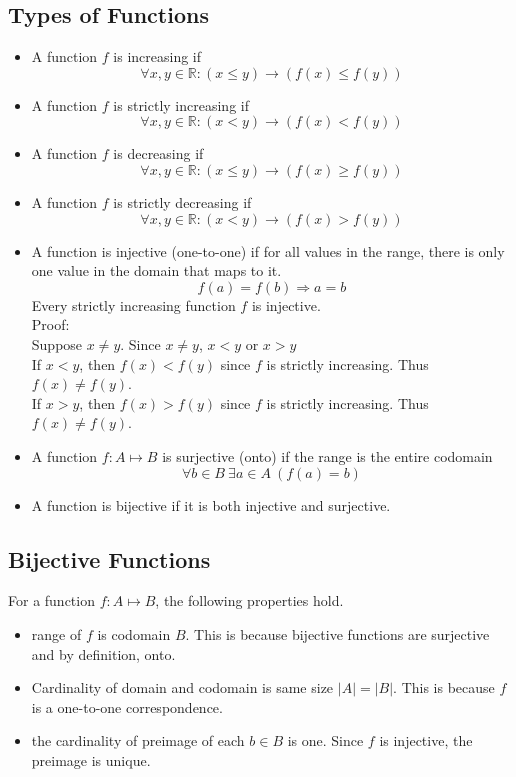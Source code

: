 \documentclass{article}
\theoremstyle{mytheoremstyle}
\theoremstyle{mytheoremstyle}
\theoremstyle{myproblemstyle}
\begin{document}
    \subsection*{Types of Functions}
    \begin{itemize}
        \item A function $f$ is increasing if
            \[
                \forall x,y\in\mathbb{R}: (x\le y) \rightarrow (f(x)\le f(y))
            \]
        \item A function $f$ is strictly increasing if
            \[
                \forall x,y\in\mathbb{R}: (x<y) \rightarrow (f(x)<f(y))
            \]
        \item A function $f$ is decreasing if
            \[
                \forall x,y\in\mathbb{R}: (x\le y) \rightarrow (f(x)\ge f(y))
            \]
        \item A function $f$ is strictly decreasing if
            \[
                \forall x,y\in\mathbb{R}: (x<y) \rightarrow (f(x)>f(y))
            \]
    \end{itemize}
    \begin{itemize}
        \item A function is injective (one-to-one) if for all values in the
            range, there is only one value in the domain that maps to it.
            \[
                f(a) = f(b) \Rightarrow a=b
            \]
            Every strictly increasing function $f$ is injective. \\
            Proof: \\
            Suppose $x\ne y$. Since $x\ne y$, $x<y$ or $x>y$ \\
            If $x<y$, then $f(x)<f(y)$ since $f$ is strictly increasing.
            Thus $f(x)\ne f(y)$. \\
            If $x>y$, then $f(x)>f(y)$ since $f$ is strictly increasing.
            Thus $f(x)\ne f(y)$.
        \item A function $f: A \mapsto B$ is surjective (onto) if the range is the entire
            codomain
            \[
                \forall b\in B\ \exists a\in A\ (f(a)=b)
            \]
        \item A function is bijective if it is both injective and surjective.
    \end{itemize}

    \subsection*{Bijective Functions}
    For a function $f: A \mapsto B$, the following properties hold.
    \begin{itemize}
        \item range of $f$ is codomain $B$. This is because bijective functions
            are surjective and by definition, onto.
        \item Cardinality of domain and codomain is same size $|A|=|B|$. This is
            because $f$ is a one-to-one correspondence.
        \item the cardinality of preimage of each $b\in B$ is one. Since $f$ is
            injective, the preimage is unique.
    \end{itemize}
\end{document}
